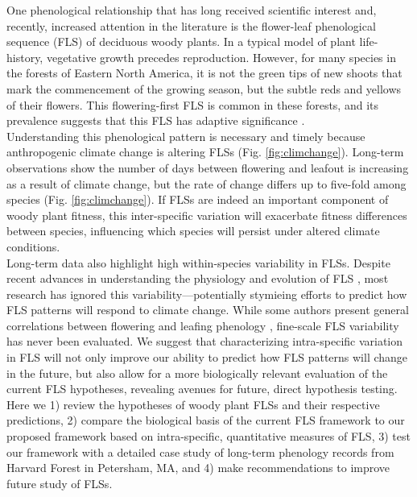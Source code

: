 \documentclass{article}
\begin{document}
\noindent One phenological relationship that has long received scientific interest \citep[see][]{Robertson1895} and, recently, increased attention in the literature \citep{Savage2019, Gougherty2018} is the flower-leaf phenological sequence (FLS) of deciduous woody plants. In a typical model of plant life-history, vegetative growth precedes reproduction. However, for many species in the forests of Eastern North America, it is not the green tips of new shoots that mark the commencement of the growing season, but the subtle reds and yellows of their flowers. This flowering-first FLS is common in these forests, and its prevalence suggests that this FLS has adaptive significance \citep{Rathcke_1985}.\\ 

\noindent Understanding this phenological pattern is necessary and timely because anthropogenic climate change is altering FLSs (Fig. \ref{fig:climchange}). Long-term observations show the number of days between flowering and leafout is increasing as a result of climate change, but the rate of change differs up to five-fold among species (Fig. \ref{fig:climchange}).  If FLSs are indeed an important component of woody plant fitness, this inter-specific variation will exacerbate fitness differences between species, influencing which species will persist under altered climate conditions.\\

\noindent Long-term data also highlight high within-species variability in FLSs. Despite recent advances in understanding the physiology and evolution of FLS \citep{Gougherty2018,Savage2019}, most research has ignored this variability---potentially stymieing efforts to predict how FLS patterns will respond to climate change. While some authors present general correlations between flowering and leafing phenology \citep{Lechowicz_1995, Ettinger2018}, fine-scale FLS variability has never been evaluated. We suggest that characterizing intra-specific variation in FLS will not only improve our ability to predict how FLS patterns will change in the future, but also allow for a more biologically relevant evaluation of the current FLS hypotheses, revealing avenues for future, direct hypothesis testing.\\

\noindent Here we 1) review the hypotheses of woody plant FLSs and their respective predictions, 2) compare the biological basis of the current FLS framework to our proposed framework based on intra-specific, quantitative measures of FLS, 3) test our framework with a detailed case study of long-term phenology records from Harvard Forest in Petersham, MA, and 4) make recommendations to improve future study of FLSs.
\end{document}
